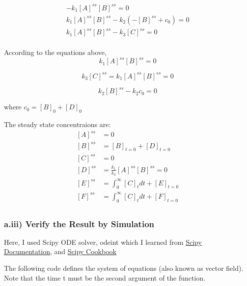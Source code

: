 \documentclass[11pt]{article}
\begin{document}
\[\begin{align}
-k_{1}[A]^{ss}[B]^{ss}=0 \\
k_{1}[A]^{ss}[B]^{ss}-k_{2}(-[B]^{ss}+c_{0})=0 \\
k_{1}[A]^{ss}[B]^{ss}-k_{3}[C]^{ss}=0 \\
\end{align}\]

    According to the equations above, \[k_{1}[A]^{ss}[B]^{ss}=0\]

\[k_{3}[C]^{ss}=k_{1}[A]^{ss}[B]^{ss}=0\]

\[k_{2}[B]^{ss}-k_{2}c_{0}=0\]

    where \(c_{0}=[B]_{0}+[D]_{0}\)

    The steady state concentraions are: \[\begin{align}
[A]^{ss}&=0 \\
[B]^{ss}&=[B]_{t=0}+[D]_{t=0} \\
[C]^{ss}&=0 \\
[D]^{ss}&=\frac{k_1}{k_2}[A]^{ss}[B]^{ss}=0 \\
[E]^{ss}&=\int_{0}^{\infty}[C]_{t}dt+[E]_{t=0} \\
[F]^{ss}&=\int_{0}^{\infty}[C]_{t}dt+[F]_{t=0} \\
\end{align}\]

    \hypertarget{a.iii-verify-the-result-by-simulation}{%
\subsubsection{a.iii) Verify the Result by
Simulation}\label{a.iii-verify-the-result-by-simulation}}

    Here, I used Scipy ODE solver, odeint which I learned from
\href{https://docs.scipy.org/doc/scipy/reference/generated/scipy.integrate.odeint.html}{Scipy
Documentation}, and
\href{http://scipy-cookbook.readthedocs.io/items/CoupledSpringMassSystem.html}{Scipy
Cookbook}

    The following code defines the system of equations (also known as vector
field). Note that the time t must be the second argument of the
function.
\end{document}
